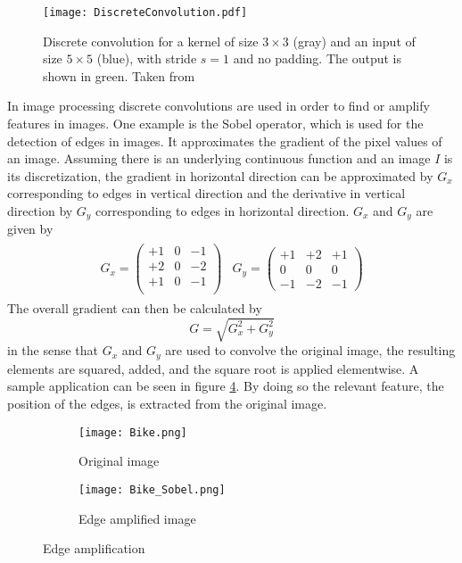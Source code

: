 \begin{figure}[H]
\centering
\texttt{[image: DiscreteConvolution.pdf]}
\caption{Discrete convolution for a kernel of size $3\times 3$ (gray) and an input of size $5\times 5$ (blue), with stride $s=1$ and no padding. The output is shown in green. Taken from \cite{Padding}}
\label{fig:Convolution}
\end{figure}

In image processing discrete convolutions are used in order to find or amplify features in images. One example is the Sobel operator, which is used for the detection of edges in images. It approximates the gradient of the pixel values of an image. Assuming there is an underlying continuous function and an image $I$ is its discretization, the gradient in horizontal direction can be approximated by $G_x$ corresponding to edges in vertical direction and the derivative in vertical direction by $G_y$ corresponding to edges in horizontal direction. $G_x$ and $G_y$ are given by
\begin{align}
  \begin{split}
G_x =
\begin{pmatrix}
+1 & 0 & -1 \\
+2 & 0 & -2 \\
+1 & 0 & -1 \\
\end{pmatrix}
\end{split}
\begin{split}
G_y = 
\begin{pmatrix}
+1 & +2 & +1 \\
0 & 0 & 0 \\
-1 & -2 & -1
\end{pmatrix}
\end{split}
\end{align}
The overall gradient can then be calculated by
\begin{equation}
G = \sqrt{G_x^2+G_y^2}
\end{equation}
in the sense that $G_x$ and $G_y$ are used to convolve the original image, the resulting elements are squared, added, and the square root is applied elementwise. A sample application can be seen in figure \ref{fig:Sobel}. By doing so the relevant feature, the position of the edges, is extracted from the original image. \\
\begin{figure}
\centering
\begin{subfigure}{.5\textwidth}
  \centering
  \texttt{[image: Bike.png]}
  \caption{Original image}
  \label{fig:sub1}
\end{subfigure}%
\begin{subfigure}{.5\textwidth}
  \centering
  \texttt{[image: Bike\_Sobel.png]}
  \caption{Edge amplified image}
  \label{fig:sub2}
\end{subfigure}
\caption{Edge amplification}
\label{fig:Sobel}
\end{figure}

